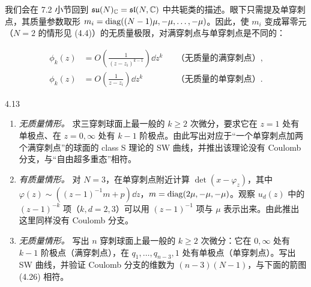 
我们会在 7.2 小节回到 $\mathfrak{su}(N)_{\mathbb{C}}=\mathfrak{sl}(N,\mathbb{C})$ 中共轭类的描述。眼下只需提及单穿刺点，其质量参数取形 $m_i=\operatorname{diag}((N-1)\mu,-\mu,\dots,-\mu)$。因此，使 $m_i$ 变成幂零元（$N=2$ 的情形见 (4.4)）的无质量极限，对满穿刺点与单穿刺点是不同的：


\begin{equation}
\begin{aligned}
  \phi_k(z)&=O\!\left(\frac{1}{(z-z_i)^{k-1}}\right)\dd z^k
    &&\text{（无质量的满穿刺点）},\\[2pt]
  \phi_k(z)&=O\!\left(\frac{1}{z-z_i}\right)\dd z^k
    &&\text{（无质量的单穿刺点）}.
\end{aligned}
  \tag{4.25}
\end{equation}

\begin{exercise}{4.13}
\begin{enumerate}[label=\arabic*.,leftmargin=2em,itemsep=1pt,topsep=1pt]
\item \textit{无质量情形。} 求三穿刺球面上最一般的 $k\ge2$ 次微分，要求它在 $z=1$ 处有单极点、在 $z=0,\infty$ 处有 $k-1$ 阶极点。由此写出对应于“一个单穿刺点加两个满穿刺点”的球面的 class S 理论的 SW 曲线，并推出该理论没有 Coulomb 分支，与“自由超多重态”相符。
\item \textit{有质量情形。} 对 $N=3$，在单穿刺点附近计算 $\det(x-\varphi_z)$，其中 $\varphi(z)\sim((z-1)^{-1}m+p)\dd z$，$m=\operatorname{diag}(2\mu,-\mu,-\mu)$。观察 $u_d(z)$ 中的 $(z-1)^{-k}$ 项（$k,d=2,3$）可以用 $(z-1)^{-1}$ 项与 $\mu$ 表示出来。由此推出这里同样没有 Coulomb 分支。
\item \textit{无质量情形。} 写出 $n$ 穿刺球面上最一般的 $k\ge2$ 次微分：它在 $0,\infty$ 处有 $k-1$ 阶极点（满穿刺点），在 $q_1,\dots,q_{n-3},1$ 处有单极点（单穿刺点）。写出 SW 曲线，并验证 Coulomb 分支的维数为 $(n-3)(N-1)$，与下面的箭图 (4.26) 相符。
\end{enumerate}
\end{exercise}

